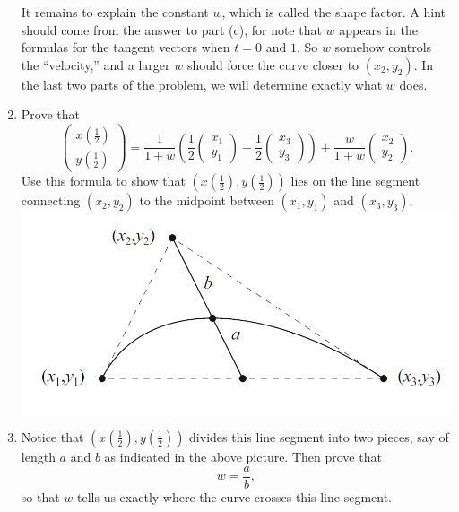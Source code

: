 \begin{exercise}{16}
\begin{enumerate}
        It remains to explain the constant $w$, which is called the shape factor. A hint should come from the answer to part (c), for note that $w$ appears in the formulas for the tangent vectors when $t=0$ and $1$. So $w$ somehow controls the ``velocity,'' and a larger $w$ should force the curve closer to $(x_2,y_2)$. In the last two parts of the problem, we will determine exactly what $w$ does.
        \item Prove that
        $$\left(\begin{array}{c}x\left(\frac{1}{2}\right)\\ y\left(\frac{1}{2}\right)\end{array}\right) = \frac{1}{1+w}\left(\frac{1}{2}\left(\begin{array}{c}x_1\\ y_1\end{array}\right) + \frac{1}{2}\left(\begin{array}{c}x_3\\ y_3\end{array}\right) \right) + \frac{w}{1+w}\left(\begin{array}{c}x_2\\ y_2\end{array}\right).$$
        Use this formula to show that $\left(x\left(\frac{1}{2}\right),y\left(\frac{1}{2}\right)\right)$ lies on the line segment connecting $(x_2,y_2)$ to the midpoint between $(x_1,y_1)$ and $(x_3,y_3)$.\\
        \includegraphics[width=0.8\linewidth]{cox-little-oshea/assets/sec1-3-ex16a.png}
        \item Notice that $\left(x\left(\frac{1}{2}\right), y\left(\frac{1}{2}\right)\right)$ divides this line segment into two pieces, say of length $a$ and $b$ as indicated in the above picture. Then prove that
        $$w = \frac{a}{b},$$
        so that $w$ tells us exactly where the curve crosses this line segment.
    \end{enumerate}
\end{exercise}
